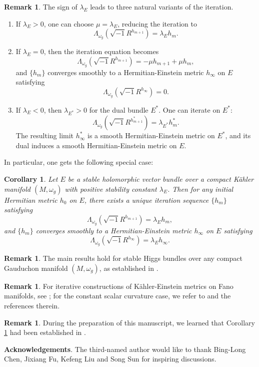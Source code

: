 \documentclass[12pt, reqno]{amsart}
\theoremstyle{plain}
\newtheorem{cor}[thm]{Corollary}
\theoremstyle{definition}
\newtheorem{remark}[thm]{Remark}
\newcommand{\bcorollary}{\begin{cor}}
\newcommand{\ecorollary}{\end{cor}}
\newcommand{\bremark}{\begin{remark}}
\newcommand{\eremark}{\end{remark}}
\newcommand{\beq}{\begin{equation}}
\newcommand{\eeq}{\end{equation}}
\newcommand{\bd}{\begin{enumerate}}
\newcommand{\ed}{\end{enumerate}}
\renewcommand{\>}{\rightarrow}
\numberwithin{equation}{section}
\begin{document}
	
	\bremark The sign of $\lambda_E$
	  leads to three natural variants of the iteration.
	\bd
	\item If $\lambda_E>0$, one can choose $\mu=\lambda_E$, reducing the iteration to 
	\beq \Lambda_{\omega_g}\left(\sqrt{-1}R^{h_{m+1}}\right)
	=\lambda_E  h_m.\eeq 
	\item If  $\lambda_E=0$, then the iteration equation becomes
	\beq \Lambda_{\omega_g}\left(\sqrt{-1}R^{h_{m+1}}\right)
	=-\mu h_{m+1}+\mu h_m,\eeq 
	and $\{h_m\}$ converges smoothly to a Hermitian-Einstein metric  $h_\infty$ on $E$ satisfying 
	\beq 
	\Lambda_{\omega_g}\left(\sqrt{-1}R^{h_{\infty}}\right)
	=0.
	\eeq 
	\item If $\lambda_E<0$, then $\lambda_{E^*}>0$ for the dual bundle $E^*$.  One can iterate on $E^*$:
	\beq \Lambda_{\omega_g}\left(\sqrt{-1}R^{h^*_{m+1}}\right)
	=\lambda_{E^*}  h^*_m.\eeq 
	The resulting limit $h^*_\infty$ is a smooth Hermitian-Einstein metric on $E^*$,
	and its dual induces a smooth Hermitian-Einstein metric on $E$.
	\ed
\eremark	
\noindent In particular,	one gets the following special case: 
	\bcorollary\label{special}
	Let $E$ be a stable holomorphic vector bundle over a compact K\"ahler manifold $(M,\omega_g)$ with positive stability constant $\lambda_E$.  Then for any initial Hermitian metric $h_0$ on $E$,   there exists a unique iteration sequence $\{h_m\}$ satisfying
	\beq 
	\Lambda_{\omega_g}\left(\sqrt{-1}R^{h_{m+1}}\right)
	=\lambda_E h_m,
	\eeq 
	and  $\{h_m\}$ converges smoothly to a Hermitian-Einstein metric $h_\infty$ on $E$ satisfying
	$$
	\Lambda_{\omega_g}\left(\sqrt{-1}R^{h_{\infty}}\right)
	=\lambda_Eh_\infty.
	$$
	\ecorollary
	
	\bremark The main results hold for stable Higgs bundles over any compact Gauduchon manifold $(M, \omega_g)$, as established in \cite{FWYY26+, WYY26b+, XYY26b+}.
	\eremark
	
		\bremark For iterative constructions of K\"ahler-Einstein metrics on Fano manifolds, see 
		\cite{Rub07, Rub08, Kel09, DR19}; for the constant scalar curvature case, we refer 
		to \cite{Zha25} and the references therein.
	\eremark
	
	\bremark  During the preparation of this manuscript, we learned that Corollary \ref{special} 
	had been established in \cite{CSZ26+}.
	\eremark
	
\noindent\textbf{Acknowledgements}. The third-named author would like to thank  Bing-Long Chen, Jixiang Fu,  Kefeng Liu and Song Sun  for inspiring  discussions.
\end{document}
